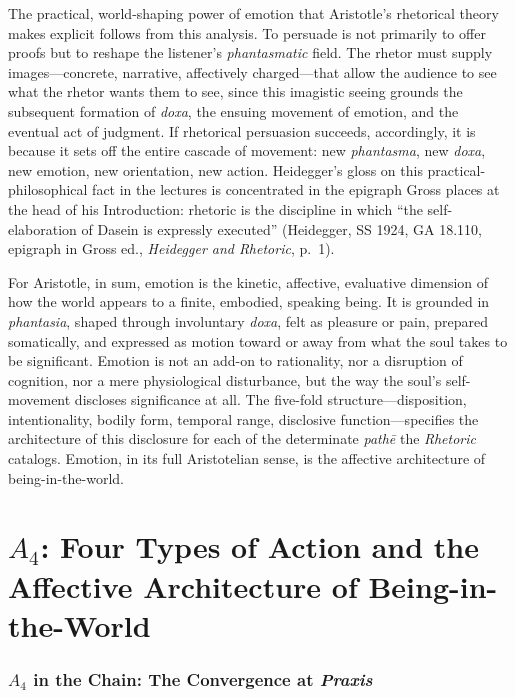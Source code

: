 The practical, world-shaping power of emotion that Aristotle's rhetorical theory makes explicit follows from this analysis. To persuade is not primarily to offer proofs but to reshape the listener's \textit{phantasmatic} field. The rhetor must supply images---concrete, narrative, affectively charged---that allow the audience to see what the rhetor wants them to see, since this imagistic seeing grounds the subsequent formation of \textit{doxa}, the ensuing movement of emotion, and the eventual act of judgment. If rhetorical persuasion succeeds, accordingly, it is because it sets off the entire cascade of movement: new \textit{phantasma}, new \textit{doxa}, new emotion, new orientation, new action. Heidegger's gloss on this practical-philosophical fact in the lectures is concentrated in the epigraph Gross places at the head of his Introduction: rhetoric is the discipline in which ``the self-elaboration of Dasein is expressly executed'' (Heidegger, SS 1924, GA 18.110, epigraph in Gross ed., \textit{Heidegger and Rhetoric}, p.~1).

For Aristotle, in sum, emotion is the kinetic, affective, evaluative dimension of how the world appears to a finite, embodied, speaking being. It is grounded in \textit{phantasia}, shaped through involuntary \textit{doxa}, felt as pleasure or pain, prepared somatically, and expressed as motion toward or away from what the soul takes to be significant. Emotion is not an add-on to rationality, nor a disruption of cognition, nor a mere physiological disturbance, but the way the soul's self-movement discloses significance at all. The five-fold structure---disposition, intentionality, bodily form, temporal range, disclosive function---specifies the architecture of this disclosure for each of the determinate \textit{pathē} the \textit{Rhetoric} catalogs. Emotion, in its full Aristotelian sense, is the affective architecture of being-in-the-world.







\section{\texorpdfstring{$A_4$}{A4}: Four Types of Action and the Affective Architecture of Being-in-the-World}

\subsubsection*{$A_4$ in the Chain: The Convergence at \textit{Praxis}}

